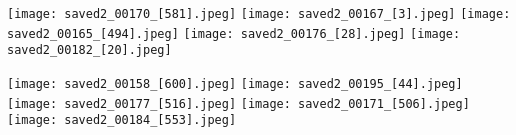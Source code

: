 \documentclass[10pt,onecolumn,letterpaper]{article}
\begin{document}
\texttt{[image: saved2\_00170\_[581].jpeg]}
\texttt{[image: saved2\_00167\_[3].jpeg]}
\texttt{[image: saved2\_00165\_[494].jpeg]}
\texttt{[image: saved2\_00176\_[28].jpeg]}
\texttt{[image: saved2\_00182\_[20].jpeg]}

\texttt{[image: saved2\_00158\_[600].jpeg]}
\texttt{[image: saved2\_00195\_[44].jpeg]}
\texttt{[image: saved2\_00177\_[516].jpeg]}
\texttt{[image: saved2\_00171\_[506].jpeg]}
\texttt{[image: saved2\_00184\_[553].jpeg]}


% 
% 
\end{document}

